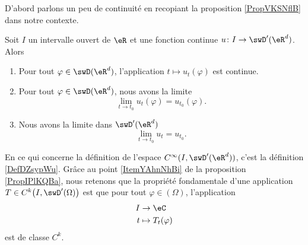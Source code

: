 D'abord parlons un peu de continuité en recopiant la proposition \ref{PropVKSNflB} dans notre contexte.
\begin{proposition}     \label{PropIPlKQBa}
    Soit \( I\) un intervalle ouvert de \( \eR\) et une fonction continue \( u\colon I\to \swD'(\eR^d)\). Alors
    \begin{enumerate}
        \item   \label{ItemYAhnNhBi}
            Pour tout \( \varphi\in\swD(\eR^d)\), l'application \( t\mapsto u_t(\varphi)\) est continue.
        \item
            Pour tout \( \varphi\in\swD(\eR^d)\), nous avons la limite
            \begin{equation}
                \lim_{t\to t_0} u_t(\varphi)=u_{t_0}(\varphi).
            \end{equation}
        \item
            Nous avons la limite dans \( \swD'(\eR^d)\)
            \begin{equation}
                \lim_{t\to t_0} u_t=u_{t_0}.
            \end{equation}
    \end{enumerate}
\end{proposition}
En ce qui concerne la définition de l'espace \( C^{\infty}(I,\swD'(\eR^d))\), c'est la définition \ref{DefDZsypWu}. Grâce au point \ref{ItemYAhnNhBi} de la proposition \ref{PropIPlKQBa}, nous retenons que la propriété fondamentale d'une application \( T\in C^k\big( I,\swD'(\Omega) \big)\) est que pour tout \( \varphi\in(\Omega)\), l'application
\begin{equation}
    \begin{aligned}
         I&\to \eC \\
        t&\mapsto T_t(\varphi) 
    \end{aligned}
\end{equation}
est de classe \( C^k\).

